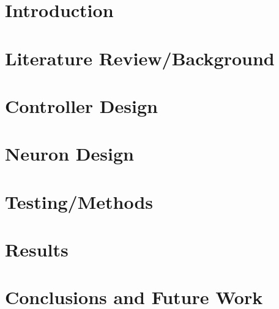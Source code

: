 \documentclass[12pt, letterpaper, oneside, onecolumn]{report} %
\begin{document}
\chapter{Introduction}
\label{chap:introduction}



\chapter{Literature Review/Background}
\label{chap:lit_review}


\chapter{Controller Design}
\label{chap:controller_design}


\chapter{Neuron Design}
\label{chap:neuron_design}


\chapter{Testing/Methods}
\label{chap:methods}


\chapter{Results}
\label{chap:results}


\chapter{Conclusions and Future Work}
\label{chap:conclusion}


\newpage
\label{chap:references}
\printbibliography[heading=bibintoc, title={Bibliography}]

% 

% 
\end{document}
